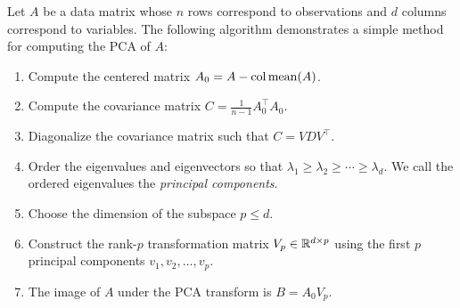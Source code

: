 Let \(A\) be a data matrix whose \(n\) rows correspond to observations and \(d\) columns correspond to variables.
The following algorithm demonstrates a simple method for computing the PCA of \(A\):
\begin{enumerate}
    \item Compute the centered matrix \(A_0 = A - \operatorname{col\,mean}(A)\).
    \item Compute the covariance matrix \(C = \frac{1}{n-1} A_0^\top A_0\).
    \item Diagonalize the covariance matrix such that \(C = V D V^\top\).
    \item Order the eigenvalues and eigenvectors so that \(\lambda_1 \geq \lambda_2 \geq \cdots \geq \lambda_d\).
    We call the ordered eigenvalues the \textit{principal components}.
    \item Choose the dimension of the subspace \(p \leq d\).
    \item Construct the rank-\(p\) transformation matrix \(V_p \in \mathbb{R}^{d \times p}\) using the first \(p\) principal components \(v_1, v_2, \dots, v_p\).
    \item The image of \(A\) under the PCA transform is \(B = A_0 V_p\).
\end{enumerate}